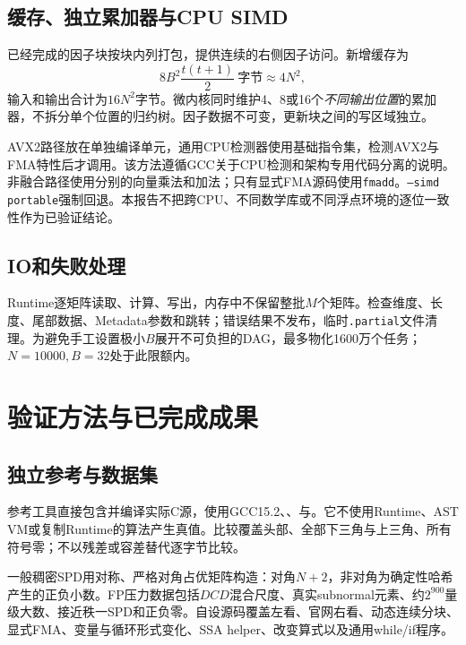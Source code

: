\documentclass[UTF8,a4paper,11pt]{ctexart}
\begin{document}
\subsection{缓存、独立累加器与CPU SIMD}
已经完成的因子块按块内列打包，提供连续的右侧因子访问。新增缓存为
\[
8B^2\frac{t(t+1)}2\ \text{字节}\approx4N^2,
\]
输入和输出合计为$16N^2$字节。微内核同时维护4、8或16个\emph{不同输出位置}的累加器，不拆分单个位置的归约树。因子数据不可变，更新块之间的写区域独立。

AVX2路径放在单独编译单元，通用CPU检测器使用基础指令集，检测AVX2与FMA特性后才调用。该方法遵循GCC关于CPU检测和架构专用代码分离的说明\cite{gccx86}。非融合路径使用分别的向量乘法和加法；只有显式FMA源码使用\texttt{fmadd}。\texttt{--simd portable}强制回退。本报告不把跨CPU、不同数学库或不同浮点环境的逐位一致性作为已验证结论。

\subsection{IO和失败处理}
Runtime逐矩阵读取、计算、写出，内存中不保留整批$M$个矩阵。检查维度、长度、尾部数据、Metadata参数和跳转；错误结果不发布，临时\texttt{.partial}文件清理。为避免手工设置极小$B$展开不可负担的DAG，最多物化1600万个任务；$N=10000,B=32$处于此限额内。

\section{验证方法与已完成成果}
\subsection{独立参考与数据集}
参考工具直接包含并编译实际C源，使用GCC15.2、、与。它不使用Runtime、AST VM或复制Runtime的算法产生真值。比较覆盖头部、全部下三角与上三角、所有符号零；不以残差或容差替代逐字节比较。

一般稠密SPD用对称、严格对角占优矩阵构造：对角$N+2$，非对角为确定性哈希产生的正负小数。FP压力数据包括$DCD$混合尺度、真实subnormal元素、约$2^{900}$量级大数、接近秩一SPD和正负零。自设源码覆盖左看、官网右看、动态连续分块、显式FMA、变量与循环形式变化、SSA helper、改变算式以及通用while/if程序。
\end{document}
